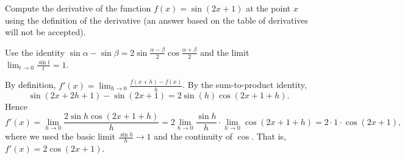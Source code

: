 
\begin{question}
Compute the derivative of the function $f(x)=\sin(2x+1)$ at the point $x$ using the definition of the derivative (an answer based on the table of derivatives will not be accepted).
\end{question}

\begin{hint}
Use the identity $\sin\alpha-\sin\beta=2\sin\frac{\alpha-\beta}{2}\cos\frac{\alpha+\beta}{2}$ and the limit $\lim_{t\to0}\frac{\sin t}{t}=1$.
\end{hint}

\begin{solution}
By definition, $f'(x)=\lim_{h\to0}\frac{f(x+h)-f(x)}{h}$. By the sum-to-product identity,
\[ \sin(2x+2h+1)-\sin(2x+1)=2\sin(h)\cos(2x+1+h). \]
Hence
\[ f'(x)=\lim_{h\to0}\frac{2\sin h\cos(2x+1+h)}{h}=2\lim_{h\to0}\frac{\sin h}{h}\cdot\lim_{h\to0}\cos(2x+1+h)=2\cdot1\cdot\cos(2x+1), \]
where we used the basic limit $\frac{\sin h}{h}\to1$ and the continuity of $\cos$. That is, $\boxed{f'(x)=2\cos(2x+1)}$.
\end{solution}
